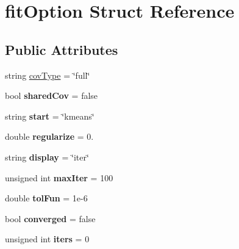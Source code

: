 \hypertarget{structfit_option}{\section{fit\+Option Struct Reference}
\label{structfit_option}
}
\subsection*{Public Attributes}
\begin{DoxyCompactItemize}
\item 
string \hyperlink{structfit_option_ae1d880f6fcd26e15f07d50c77c5cceea}{cov\+Type} = \char`\"{}full\char`\"{}
\item 
\hypertarget{structfit_option_a2efaf3629539e3864967853058e80420}{bool {\bfseries shared\+Cov} = false}\label{structfit_option_a2efaf3629539e3864967853058e80420}

\item 
\hypertarget{structfit_option_a4c1ecd5ba984e2e12faa29217c78f931}{string {\bfseries start} = \char`\"{}kmeans\char`\"{}}\label{structfit_option_a4c1ecd5ba984e2e12faa29217c78f931}

\item 
\hypertarget{structfit_option_abffa02537679becf07413b31f5889e6f}{double {\bfseries regularize} = 0.}\label{structfit_option_abffa02537679becf07413b31f5889e6f}

\item 
\hypertarget{structfit_option_acd949efbbb51ddf447d4cb86fd2ac901}{string {\bfseries display} = \char`\"{}iter\char`\"{}}\label{structfit_option_acd949efbbb51ddf447d4cb86fd2ac901}

\item 
\hypertarget{structfit_option_a54d1906ece53c348047c8b404ff06053}{unsigned int {\bfseries max\+Iter} = 100}\label{structfit_option_a54d1906ece53c348047c8b404ff06053}

\item 
\hypertarget{structfit_option_a4523efadc5bc4f29cd1648ac4ca018dd}{double {\bfseries tol\+Fun} = 1e-\/6}\label{structfit_option_a4523efadc5bc4f29cd1648ac4ca018dd}

\item 
\hypertarget{structfit_option_a600d82e88e845abb5a442f80eecf89cb}{bool {\bfseries converged} = false}\label{structfit_option_a600d82e88e845abb5a442f80eecf89cb}

\item 
\hypertarget{structfit_option_a711048d488fccee5740b31e4149c46de}{unsigned int {\bfseries iters} = 0}\label{structfit_option_a711048d488fccee5740b31e4149c46de}

\end{DoxyCompactItemize}



